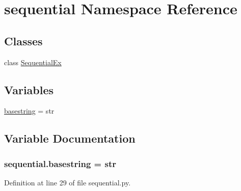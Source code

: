 \hypertarget{namespacesequential}{\section{sequential Namespace Reference}
\label{namespacesequential}
}
\subsection*{Classes}
\begin{DoxyCompactItemize}
\item 
class \hyperlink{classsequential_1_1_sequential_ex}{Sequential\-Ex}
\end{DoxyCompactItemize}
\subsection*{Variables}
\begin{DoxyCompactItemize}
\item 
\hyperlink{namespacesequential_a2bcf64415a328c57bebc08f7fed9d30c}{basestring} = str
\end{DoxyCompactItemize}


\subsection{Variable Documentation}
\hypertarget{namespacesequential_a2bcf64415a328c57bebc08f7fed9d30c}{
\subsubsection[{basestring}]{\setlength{\rightskip}{0pt plus 5cm}sequential.\-basestring = str}}\label{namespacesequential_a2bcf64415a328c57bebc08f7fed9d30c}


Definition at line 29 of file sequential.\-py.

